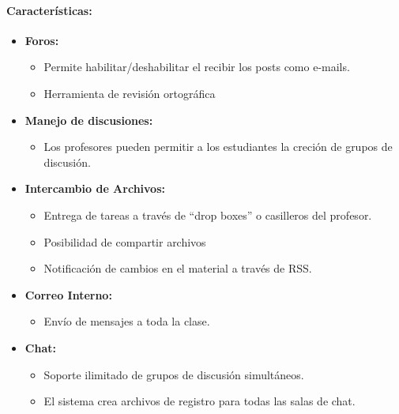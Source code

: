 	\paragraph{Características:} 
	\begin{itemize}
		\item \textbf {Foros:}
			\begin{itemize}
				\item Permite habilitar/deshabilitar el recibir los posts como e-mails.
				\item Herramienta de revisión ortográfica
			\end{itemize}
	\end{itemize}
	\begin{itemize}
		\item \textbf{Manejo de discusiones:}
			\begin{itemize}
				\item Los profesores pueden permitir a los estudiantes la creción de grupos de discusión.
			\end{itemize}
	\end{itemize}
	\begin{itemize}
		\item \textbf{Intercambio de Archivos:}
			\begin{itemize}
				\item Entrega de tareas a través de ``drop boxes'' o casilleros del profesor.
				\item Posibilidad de compartir archivos
				\item Notificación de cambios en el material a través de RSS.
			\end{itemize}
	\end{itemize}
	\begin{itemize}
		\item \textbf{Correo Interno:}
			\begin{itemize}
				\item Envío de mensajes a toda la clase.
			\end{itemize}
	\end{itemize}
	\begin{itemize}
		\item \textbf{Chat:}
			\begin{itemize}
				\item Soporte ilimitado de grupos de discusión simultáneos.
				\item El sistema crea archivos de registro para todas las salas de chat.
			\end{itemize}
	\end{itemize}
